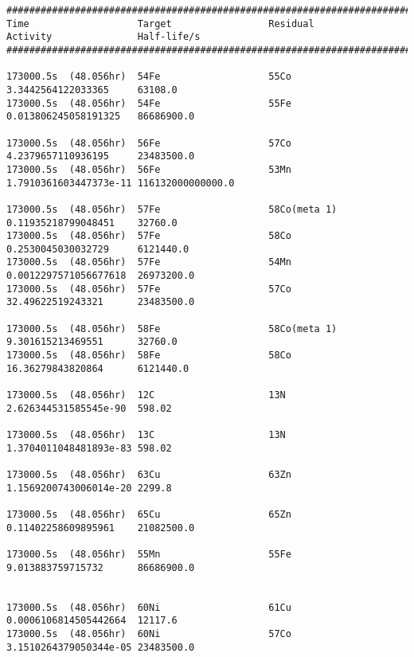 \begin{lstlisting}[style=sOutputFile,caption={Final results for steel irradiation},label={listing:alexsteel}]
####################################################################################################################
Time                   Target                 Residual               Activity               Half-life/s            
####################################################################################################################

173000.5s  (48.056hr)  54Fe                   55Co                   3.3442564122033365     63108.0               
173000.5s  (48.056hr)  54Fe                   55Fe                   0.013806245058191325   86686900.0            

173000.5s  (48.056hr)  56Fe                   57Co                   4.2379657110936195     23483500.0            
173000.5s  (48.056hr)  56Fe                   53Mn                   1.7910361603447373e-11 116132000000000.0     

173000.5s  (48.056hr)  57Fe                   58Co(meta 1)           0.11935218799048451    32760.0               
173000.5s  (48.056hr)  57Fe                   58Co                   0.2530045030032729     6121440.0             
173000.5s  (48.056hr)  57Fe                   54Mn                   0.0012297571056677618  26973200.0            
173000.5s  (48.056hr)  57Fe                   57Co                   32.49622519243321      23483500.0            

173000.5s  (48.056hr)  58Fe                   58Co(meta 1)           9.301615213469551      32760.0               
173000.5s  (48.056hr)  58Fe                   58Co                   16.36279843820864      6121440.0             

173000.5s  (48.056hr)  12C                    13N                    2.626344531585545e-90  598.02                

173000.5s  (48.056hr)  13C                    13N                    1.3704011048481893e-83 598.02                

173000.5s  (48.056hr)  63Cu                   63Zn                   1.1569200743006014e-20 2299.8                

173000.5s  (48.056hr)  65Cu                   65Zn                   0.11402258609895961    21082500.0            

173000.5s  (48.056hr)  55Mn                   55Fe                   9.013883759715732      86686900.0            


173000.5s  (48.056hr)  60Ni                   61Cu                   0.0006106814505442664  12117.6               
173000.5s  (48.056hr)  60Ni                   57Co                   3.1510264379050344e-05 23483500.0            


\end{lstlisting}
